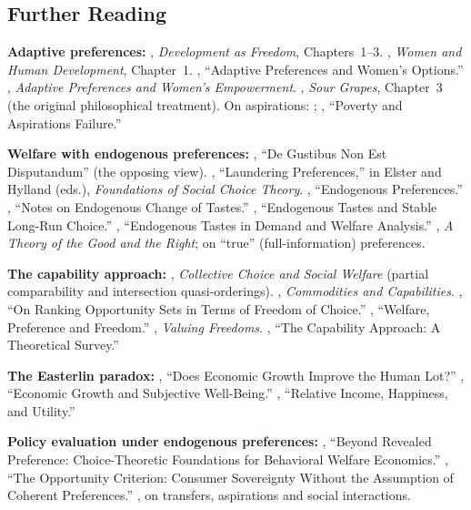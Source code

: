 \documentclass[../structural_economics_book.tex]{subfiles}
\begin{document}
\subsection*{Further Reading}

\textbf{Adaptive preferences:} \citet{sen1999development}, \textit{Development as Freedom}, Chapters~1--3. \citet{nussbaum2000women}, \textit{Women and Human Development}, Chapter~1. \citet{nussbaum2001adaptive}, ``Adaptive Preferences and Women's Options.'' \citet{khader2011adaptive}, \textit{Adaptive Preferences and Women's Empowerment}. \citet{elster1983sour}, \textit{Sour Grapes}, Chapter~3 (the original philosophical treatment). On aspirations: \citet{genicot2017aspirations}; \citet{dalton2016poverty}, ``Poverty and Aspirations Failure.''

\textbf{Welfare with endogenous preferences:} \citet{stigler1977gustibus}, ``De Gustibus Non Est Disputandum'' (the opposing view). \citet{goodin1986laundering}, ``Laundering Preferences,'' in Elster and Hylland (eds.), \textit{Foundations of Social Choice Theory}. \citet{bowles1998endogenous}, ``Endogenous Preferences.'' \citet{weizsacker1971notes}, ``Notes on Endogenous Change of Tastes.'' \citet{hammond1976endogenous}, ``Endogenous Tastes and Stable Long-Run Choice.'' \citet{pollak1978endogenous}, ``Endogenous Tastes in Demand and Welfare Analysis.'' \citet{brandt1979theory}, \textit{A Theory of the Good and the Right}; \citet{harsanyi1977morality} on ``true'' (full-information) preferences.

\textbf{The capability approach:} \citet{sen1970collective}, \textit{Collective Choice and Social Welfare} (partial comparability and intersection quasi-orderings). \citet{sen1985commodities}, \textit{Commodities and Capabilities}. \citet{pattanaik1990ranking}, ``On Ranking Opportunity Sets in Terms of Freedom of Choice.'' \citet{sen1991welfare}, ``Welfare, Preference and Freedom.'' \citet{alkire2002valuing}, \textit{Valuing Freedoms}. \citet{robeyns2005capability}, ``The Capability Approach: A Theoretical Survey.''

\textbf{The Easterlin paradox:} \citet{easterlin1974does}, ``Does Economic Growth Improve the Human Lot?'' \citet{stevenson2008economic}, ``Economic Growth and Subjective Well-Being.'' \citet{clark2008relative}, ``Relative Income, Happiness, and Utility.''

\textbf{Policy evaluation under endogenous preferences:} \citet{bernheim2009beyond}, ``Beyond Revealed Preference: Choice-Theoretic Foundations for Behavioral Welfare Economics.'' \citet{sugden2004opportunity}, ``The Opportunity Criterion: Consumer Sovereignty Without the Assumption of Coherent Preferences.'' \citet{macours2014changing}, on transfers, aspirations and social interactions.
\end{document}

